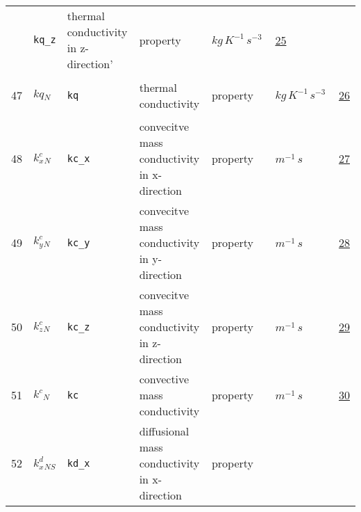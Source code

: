 \begin{longtable}{|p{1cm}|p{2.5cm}|p{4.5cm}|p{8cm}|p{3.0cm}|p{3cm}|p{1cm}|}
             & \verb|kq_z|
             & thermal conductivity in z-direction'
             & \begin{lay}property \end{lay}
             & $ kg \,K^{-1} \,s^{-3} \, $
             & \hyperlink{"e:25"}{ 25 }
                 \\
    47
             & \hypertarget{"v:47"}{ $ {kq}{_{N}} $}
             & \verb|kq|
             & thermal conductivity
             & \begin{lay}property \end{lay}
             & $ kg \,K^{-1} \,s^{-3} \, $
             & \hyperlink{"e:26"}{ 26 }
                 \\
    48
             & \hypertarget{"v:48"}{ $ {{k^c_x}}{_{N}} $}
             & \verb|kc_x|
             & convecitve mass conductivity in x-direction
             & \begin{lay}property \end{lay}
             & $ m^{-1} \,s \, $
             & \hyperlink{"e:27"}{ 27 }
                 \\
    49
             & \hypertarget{"v:49"}{ $ {{k^c_y}}{_{N}} $}
             & \verb|kc_y|
             & convecitve mass conductivity in y-direction
             & \begin{lay}property \end{lay}
             & $ m^{-1} \,s \, $
             & \hyperlink{"e:28"}{ 28 }
                 \\
    50
             & \hypertarget{"v:50"}{ $ {{k^c_z}}{_{N}} $}
             & \verb|kc_z|
             & convecitve mass conductivity in z-direction
             & \begin{lay}property \end{lay}
             & $ m^{-1} \,s \, $
             & \hyperlink{"e:29"}{ 29 }
                 \\
    51
             & \hypertarget{"v:51"}{ $ {{k^c}}{_{N}} $}
             & \verb|kc|
             & convective mass conductivity
             & \begin{lay}property \end{lay}
             & $ m^{-1} \,s \, $
             & \hyperlink{"e:30"}{ 30 }
                 \\
    52
             & \hypertarget{"v:52"}{ $ {{k^d_x}}{_{{N S}}} $}
             & \verb|kd_x|
             & diffusional mass conductivity in x-direction
             & \begin{lay}property \end{lay}

\end{longtable}
